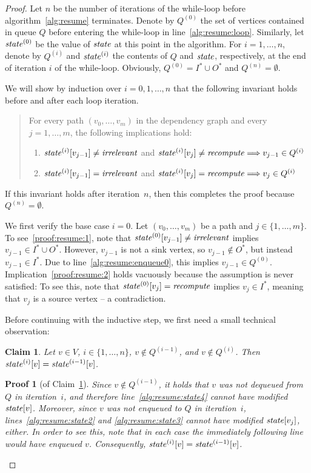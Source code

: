 \documentclass[paper=letter,fontsize=11pt,captions=tableheading]{scrartcl}
\numberwithin{equation}{section}
\theoremstyle{algorithm}
\theoremstyle{plain}
\newtheorem{claim}[equation]{Claim}
\theoremstyle{nonumberplain}
\newtheorem{proof}{Proof}
\newtheorem{subproof}{Proof}
\begin{document}
\begin{proof}
Let $n$ be the number of iterations of the while-loop before algorithm~\ref{alg:resume} terminates. Denote by $Q^{(0)}$ the set of vertices contained in queue $Q$ before entering the while-loop in line~\ref{alg:resume:loop}. Similarly, let $\mathit{state}^{(0)}$ be the value of $\mathit{state}$ at this point in the algorithm. For $i = 1, \dots, n$, denote by $Q^{(i)}$ and $\mathit{state}^{(i)}$ the contents of $Q$ and $\mathit{state}$, respectively, at the end of iteration $i$ of the while-loop. Obviously, $Q^{(0)} = I^* \cup O^*$ and $Q^{(n)} = \emptyset$.

We will show by induction over $i = 0, 1, \dots, n$ that the following invariant holds before and after each loop iteration.
\begin{quote}
	For every path $(v_0, \dots, v_m)$ in the dependency graph and every $j = 1, \dots, m$, the following implications hold:
	\begin{enumerate}
		\item \label{proof:resume:1} $\mathit{state}^{(i)}[v_{j-1}] \neq \mathit{irrelevant}$ and $\mathit{state}^{(i)}[v_j] \neq \mathit{recompute} \Longrightarrow v_{j-1} \in Q^{(i)}$
		\item \label{proof:resume:2} $\mathit{state}^{(i)}[v_{j-1}] = \mathit{irrelevant}$ and $\mathit{state}^{(i)}[v_j] = \mathit{recompute}  \Longrightarrow v_j \in Q^{(i)}$
	\end{enumerate}
\end{quote}
If this invariant holds after iteration~$n$, then this completes the proof because $Q^{(n)} = \emptyset$.

We first verify the base case $i = 0$. Let $(v_0, \dots, v_m)$ be a path and $j \in \{ 1, \dots, m\}$. To see~\eqref{proof:resume:1}, note that $\mathit{state}^{(0)}[v_{j-1}] \neq \mathit{irrelevant}$ implies $v_{j-1} \in I^* \cup O^*$. However, $v_{j-1}$ is not a sink vertex, so $v_{j-1} \notin O^*$, but instead $v_{j-1} \in I^*$. Due to line~\ref{alg:resume:enqueue0}, this implies $v_{j-1} \in Q^{(0)}$. Implication~\eqref{proof:resume:2} holds vacuously because the assumption is never satisfied: To see this, note that $\mathit{state}^{(0)}[v_j] = \mathit{recompute}$ implies $v_j \in I^*$, meaning that $v_j$ is a source vertex -- a contradiction.

Before continuing with the inductive step, we first need a small technical observation:
\begin{claim} \label{alg:resume:claim}
	Let $v \in V$, $i \in \{ 1, \dots, n \}$, $v \notin Q^{(i - 1)}$, and $v \notin Q^{(i)}$. Then $\mathit{state}^{(i)}[v] = \mathit{state}^{(i - 1)}[v]$.
\end{claim}
\begin{subproof}[of Claim~\ref{alg:resume:claim}]
	Since $v \notin Q^{(i-1)}$, it holds that $v$ was not dequeued from $Q$ in iteration~$i$, and therefore line~\ref{alg:resume:state4} cannot have modified $\mathit{state}[v]$. Moreover, since $v$ was not enqueued to $Q$ in iteration~$i$, lines~\ref{alg:resume:state2} and \ref{alg:resume:state3} cannot have modified $\mathit{state}[v_j]$, either. In order to see this, note that in each case the immediately following line would have enqueued $v$. Consequently, $\mathit{state}^{(i)}[v] = \mathit{state}^{(i - 1)}[v]$.
\end{subproof}


\end{proof}
\end{document}
